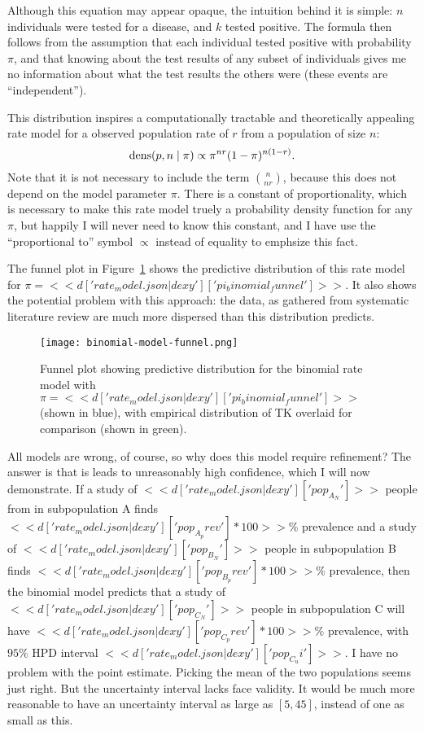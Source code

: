 Although this equation may appear opaque, the intuition behind it is
simple: $n$ individuals were tested for a disease, and $k$ tested
positive. The formula then follows from the assumption that each
individual tested positive with probability $\pi$, and that 
knowing about the test results of any subset of individuals gives me
no information about what the test results the others were
(these events are ``independent'').

This distribution inspires a computationally tractable and
theoretically appealing rate model for a observed population rate of
$r$ from a population of size $n$:
\[
\operatorname{dens}(p,n\;|\; \pi) \propto \pi^{nr}(1-\pi)^{n(1-r)}.
\]
Note that it is not necessary to include the term $\binom{n}{nr}$,
because this does not depend on the model parameter $\pi$. There is a
constant of proportionality, which is necessary to make this rate
model truely a probability density function for any $\pi$, but happily
I will never need to know this constant, and I have use the ``proportional to''
symbol $\propto$ instead of equality to emphsize this fact.

The funnel plot in Figure~\ref{fig:theory-rate_model-binom_funnel}
shows the predictive distribution of this rate model for $\pi=<<
d['rate_model.json|dexy']['pi_binomial_funnel'] >>$.  It also shows
the potential problem with this approach: the data, as gathered from
systematic literature review are much more dispersed than this
distribution predicts.

\begin{figure}[ht]
\begin{center}
\texttt{[image: binomial-model-funnel.png]}
\end{center}
\caption{Funnel plot showing predictive distribution for the binomial
  rate model with $\pi=<<
  d['rate_model.json|dexy']['pi_binomial_funnel'] >>$ (shown in blue),
  with empirical distribution of TK overlaid for comparison (shown in
  green).}
\label{fig:theory-rate_model-binom_funnel}
\end{figure}

All models are wrong, of course, so why does this model require
refinement? The answer is that is leads to unreasonably high confidence,
which I will now demonstrate.  If a study of $<< d['rate_model.json|dexy']['pop_A_N'] >>$
 people from in subpopulation A
finds $<< d['rate_model.json|dexy']['pop_A_prev']*100 >>\%$ prevalence and a
study of $<< d['rate_model.json|dexy']['pop_B_N'] >>$ people in subpopulation B
 finds $<< d['rate_model.json|dexy']['pop_B_prev']*100
>>\%$ prevalence, then the binomial model predicts that a study of
$<< d['rate_model.json|dexy']['pop_C_N'] >>$ people in subpopulation C will
 have $<< d['rate_model.json|dexy']['pop_C_prev']*100>>\%$ prevalence, with $95\%$ HPD interval
$<< d['rate_model.json|dexy']['pop_C_ui'] >>$.  I have no problem with the point
 estimate.  Picking the mean of the two populations seems just right.
 But the uncertainty interval lacks face validity.  It would be much
 more reasonable to have an uncertainty interval as large as $[5,45]$,
 instead of one as small as this.

